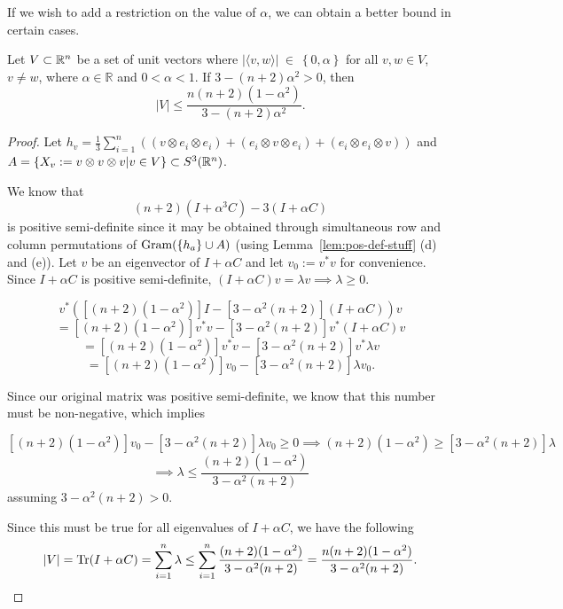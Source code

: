 If we wish to add a restriction on the value of $\alpha$, we can obtain a better bound in certain cases.

\begin{theorem}\label{th:tub_vec_real}
 Let $V \subset \mathbb{R}^n$ be a set of unit vectors where $|\langle v,w\rangle|~\in~\left\{0,\alpha\right\}$ for all $v,w\in V$, $v\neq w$, where $\alpha \in \mathbb{R}$ and $0 < \alpha < 1$. If $3-(n+2)\alpha^2 > 0$, then \begin{equation}\label{eq:tub_vec_real}|V|\leq \frac{n(n+2)(1-\alpha^2)}{3-(n+2)\alpha^2}.\end{equation}

 \begin{proof}
  Let $h_v = \frac13\sum_{i=1}^n ((v \otimes e_i \otimes e_i) + (e_i \otimes v \otimes e_i) + (e_i \otimes e_i \otimes v))$ and $A = \{X_v := v \otimes v \otimes v | v \in V\}\subset S^3(\mathbb{R}^n)$.

  We know that $$(n+2)(I+\alpha^3C) -3(I+\alpha C)$$ is positive semi-definite since it may be obtained through simultaneous row and column permutations of $\text{Gram}(\left\{h_a\right\}\cup A)$ (using Lemma~\ref{lem:pos-def-stuff} (d) and (e)). Let $v$ be an eigenvector of $I+\alpha C$ and let $v_0 := v^*v$ for convenience. Since $I+\alpha C$ is positive semi-definite, $(I + \alpha C)v = \lambda v \implies \lambda \geq 0$.

$$v^*([(n+2)(1-\alpha^2)]I - [3-\alpha^2(n+2)](I+\alpha C))v $$ $$= [(n+2)(1-\alpha^2)]v^*v - [3-\alpha^2(n+2)]v^*(I+\alpha C)v$$ $$= [(n+2)(1-\alpha^2)]v^*v - [3-\alpha^2(n+2)]v^*\lambda v$$ $$= [(n+2)(1-\alpha^2)]v_0 - [3-\alpha^2(n+2)]\lambda v_0.$$

Since our original matrix was positive semi-definite, we know that this number must be non-negative, which implies

$$[(n+2)(1-\alpha^2)]v_0 - [3-\alpha^2(n+2)]\lambda v_0 \geq 0 \implies (n+2)(1-\alpha^2) \geq [3-\alpha^2(n+2)]\lambda$$ $$\implies \lambda \leq \frac{(n+2)(1-\alpha^2)}{3-\alpha^2(n+2)}$$ assuming $3-\alpha^2(n+2) > 0$.

Since this must be true for all eigenvalues of $I+\alpha C$, we have the following
$$|V| = \text{Tr}(I+\alpha C) = \sum_{i=1}^{n} \lambda \leq \sum_{i=1}^{n} \frac{(n+2)(1-\alpha^2)}{3-\alpha^2(n+2)} = \frac{n(n+2)(1-\alpha^2)}{3-\alpha^2(n+2)}.$$
 \end{proof}

\end{theorem}



